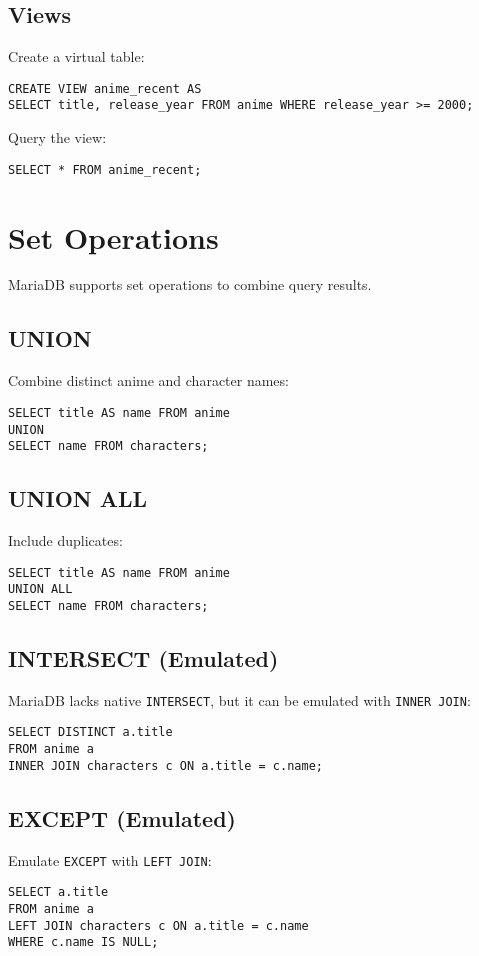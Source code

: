 \documentclass[10pt]{article}
\begin{document}
\subsection{Views}
Create a virtual table:
\begin{verbatim}
CREATE VIEW anime_recent AS
SELECT title, release_year FROM anime WHERE release_year >= 2000;
\end{verbatim}
Query the view:
\begin{verbatim}
SELECT * FROM anime_recent;
\end{verbatim}

\section{Set Operations}
MariaDB supports set operations to combine query results.

\subsection{UNION}
Combine distinct anime and character names:
\begin{verbatim}
SELECT title AS name FROM anime
UNION
SELECT name FROM characters;
\end{verbatim}

\subsection{UNION ALL}
Include duplicates:
\begin{verbatim}
SELECT title AS name FROM anime
UNION ALL
SELECT name FROM characters;
\end{verbatim}

\subsection{INTERSECT (Emulated)}
MariaDB lacks native \texttt{INTERSECT}, but it can be emulated with \texttt{INNER JOIN}:
\begin{verbatim}
SELECT DISTINCT a.title
FROM anime a
INNER JOIN characters c ON a.title = c.name;
\end{verbatim}

\subsection{EXCEPT (Emulated)}
Emulate \texttt{EXCEPT} with \texttt{LEFT JOIN}:
\begin{verbatim}
SELECT a.title
FROM anime a
LEFT JOIN characters c ON a.title = c.name
WHERE c.name IS NULL;
\end{verbatim}
\end{document}
